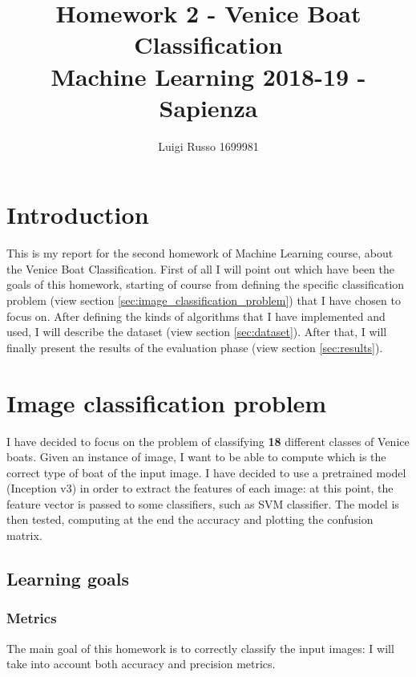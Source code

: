 \documentclass[12pt]{article}
\title{Homework 2 - Venice Boat Classification\\
	\large Machine Learning 2018-19 - Sapienza}
\author{Luigi Russo 1699981}
\begin{document}
	
\maketitle
\newpage
\tableofcontents
\newpage
\section{Introduction}
This is my report for the second homework of Machine Learning course, about the Venice Boat Classification. First of all I will point out which have been the goals of this homework, starting of course from defining the specific classification problem (view section \ref{sec:image_classification_problem}) that I have chosen to focus on. After defining the kinds of algorithms that I have implemented and used, I will describe the dataset (view section \ref{sec:dataset}). After that, I will finally present the results of the evaluation phase (view section \ref{sec:results}).

\section{Image classification problem}
\label{sec:image_classification}
I have decided to focus on the problem of classifying \textbf{18} different classes of Venice boats. Given an instance of image, I want to be able to compute which is the correct type of boat of the input image. I have decided to use a pretrained model (Inception v3) in order to extract the features of each image: at this point, the feature vector is passed to some classifiers, such as SVM classifier. The model is then tested, computing at the end the accuracy and plotting the confusion matrix.

\subsection{Learning goals}
\subsubsection{Metrics}
The main goal of this homework is to correctly classify the input images: I will take into account both accuracy and precision metrics.
\end{document}
